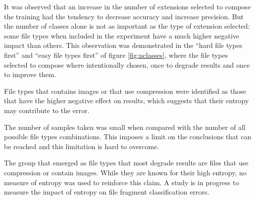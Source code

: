 It was observed that an increase in the number of extensions selected to compose the training had the tendency to decrease accuracy and increase precision. But the number of classes alone is not as important as the type of extension selected: some file types when included in the experiment have a much higher negative impact than others. This observation was demonstrated in the ``hard file types first'' and ``easy file types first'' of figure \ref{fig:nclasses}, where the file types selected to compose  where intentionally chosen, once to degrade results and once to improve them.

File types that contains images or that use compression were identified as those that have the higher negative effect on results, which suggests that their entropy may contribute to the error.


The number of samples taken was small when compared with the number of all possible file types combinations. This imposes a limit on the conclusions that can be reached and this limitation is hard to overcome.

The group that emerged as file types that most degrade results are files that use compression or contain images. While they are known for their high entropy, no measure of entropy was used to reinforce this claim. A study is in progress to measure the impact of entropy on file fragment classification errors.